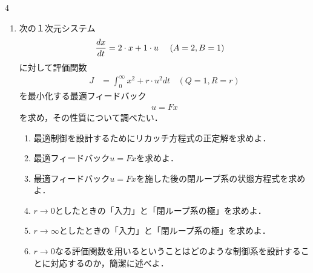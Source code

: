 \documentclass[fleqn]{article}
\begin{document}
\begin{multicols}{4}
\begin{enumerate}
\item
次の１次元システム
\vspace{-1mm}
\begin{align}
	\frac{dx}{dt} &= 2 \cdot x + 1 \cdot u
	\ \ \ \  (A=2, B=1) 
\nonumber
\vspace{-4mm}
\end{align}
に対して評価関数
\begin{align}
	J &= \int_0^\infty  x^2 + r \cdot u^2 dt
	\ \ \ \  (Q=1, R=r)
\nonumber
\end{align}
を最小化する最適フィードバック
\begin{align}
	u=Fx
\nonumber
\end{align}
を求め，その性質について調べたい．

\begin{enumerate}

\item
最適制御を設計するためにリカッチ方程式の正定解を求めよ．
\vspace{12cm}


\item
最適フィードバック$u=Fx$を求めよ．
\vspace{4cm}

\vfill\null
\columnbreak

\item
最適フィードバック$u=Fx$を施した後の閉ループ系の状態方程式を求めよ．
\vspace{4cm}


\item
$r \rightarrow 0$としたときの「入力」と「閉ループ系の極」を求めよ．
\vspace{4cm}

\item
$r \rightarrow \infty$としたときの「入力」と「閉ループ系の極」を求めよ．
\vspace{4cm}

\item
$r \rightarrow 0$なる評価関数を用いるということはどのような制御系を設計することに対応するのか，簡潔に述べよ．
\vspace{5cm}


\end{enumerate}
\end{enumerate}
\end{multicols}
\end{document}
